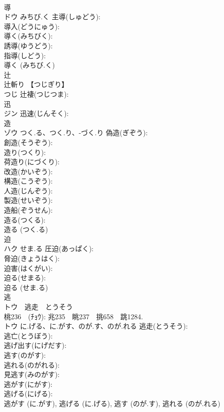 \documentclass[8pt]{extreport}
\begin{document}
\begin{CJK}{UTF8}{min}
\\	導			
\\	ドウ	みちび.く	主導(しゅどう): 
\\	導入(どうにゅう): 
\\	導く(みちびく): 
\\	誘導(ゆうどう): 
\\	指導(しどう): 
\\	導く (みちび.く)
\\	辻			
\\	辻斬り 【つじぎり】 
\\	つじ	辻褄(つじつま): 
\\	迅			
\\	ジン		迅速(じんそく): 
\\	造			
\\	ゾウ	つく.る、つく.り、-づく.り	偽造(ぎぞう): 
\\	創造(そうぞう): 
\\	造り(つくり): 
\\	荷造り(にづくり): 
\\	改造(かいぞう): 
\\	構造(こうぞう): 
\\	人造(じんぞう): 
\\	製造(せいぞう): 
\\	造船(ぞうせん): 
\\	造る(つくる): 
\\	造る (つく.る)
\\	迫			
\\	ハク	せま.る	圧迫(あっぱく): 
\\	脅迫(きょうはく): 
\\	迫害(はくがい): 
\\	迫る(せまる): 
\\	迫る (せま.る)
\\	逃			
\\	トウ　逃走　とうそう
\\	桃236　(ﾁｮｳ): 兆235　眺237　挑658　跳1284.	
\\	トウ	に.げる、に.がす、のが.す、のが.れる	逃走(とうそう): 
\\	逃亡(とうぼう): 
\\	逃げ出す(にげだす): 
\\	逃す(のがす): 
\\	逃れる(のがれる): 
\\	見逃す(みのがす): 
\\	逃がす(にがす): 
\\	逃げる(にげる): 
\\	逃がす (に.がす), 逃げる (に.げる), 逃す (のが.す), 逃れる (のが.れる)

\end{CJK}
\end{document}

